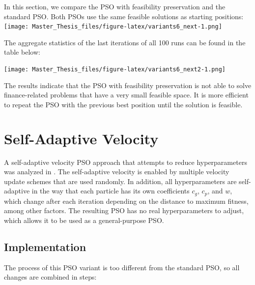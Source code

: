 \documentclass[
  oneside]{book}
\begin{document}
In this section, we compare the PSO with feasibility preservation and the standard PSO. Both PSOs use the same feasible solutions as starting positions:
\texttt{[image: Master\_Thesis\_files/figure-latex/variants6\_next-1.png]}

The aggregate statistics of the last iterations of all 100 runs can be found in the table below:

\texttt{[image: Master\_Thesis\_files/figure-latex/variants6\_next2-1.png]}

The results indicate that the PSO with feasibility preservation is not able to solve finance-related problems that have a very small feasible space. It is more efficient to repeat the PSO with the previous best position until the solution is feasible.

\hypertarget{self-adaptive-velocity}{%
\section{Self-Adaptive Velocity}\label{self-adaptive-velocity}}

A self-adaptive velocity PSO approach that attempts to reduce hyperparameters was analyzed in \citep{FaYa2014}. The self-adaptive velocity is enabled by multiple velocity update schemes that are used randomly. In addition, all hyperparameters are self-adaptive in the way that each particle has its own coefficients \(c_g\), \(c_p\), and \(w\), which change after each iteration depending on the distance to maximum fitness, among other factors. The resulting PSO has no real hyperparameters to adjust, which allows it to be used as a general-purpose PSO.

\hypertarget{implementation-2}{%
\subsection{Implementation}\label{implementation-2}}

The process of this PSO variant is too different from the standard PSO, so all changes are combined in steps:
\end{document}
